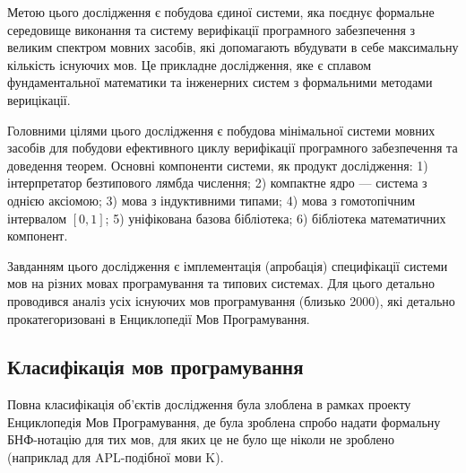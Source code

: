 Метою цього дослідження є побудова єдиної системи, яка поєднує формальне середовище
виконання та систему верифікації програмного забезпечення з великим спектром мовних
засобів, які допомагають вбудувати в себе максимальну кількість існуючих мов.
Це прикладне дослідження, яке є сплавом фундаментальної математики та інженерних
систем з формальними методами верицікації.

Головними цілями цього дослідження є побудова мінімальної системи
мовних засобів для побудови ефективного циклу верифікації програмного
забезпечення та доведення теорем. Основні компоненти системи, як продукт дослідження:
1) інтерпретатор безтипового лямбда числення;
2) компактне ядро --- система з однією аксіомою;
3) мова з індуктивними типами;
4) мова з гомотопічним інтервалом $[0,1]$;
5) уніфікована базова бібліотека;
6) бібліотека математичних компонент.

Завданням цього дослідження є імплементація (апробація)
специфікації системи мов на різних мовах програмування та типових системах.
Для цього детально проводився аналіз усіх існуючих мов
програмування (близько 2000), які детально прокатегоризовані
в Енциклопедії Мов Програмування.

\subsection{Класифікація мов програмування}

Повна класифікація об'єктів дослідження була злоблена в рамках проекту
Енциклопедія Мов Програмування, де була зроблена спробо надати
формальну БНФ-нотацію для тих мов, для яких це не було ще ніколи
не зроблено (наприклад для APL-подібної мови K).

